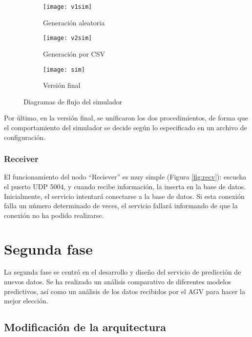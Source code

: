 \begin{figure}
    \centering
    \begin{subfigure}[b]{0.45\textwidth}
        \centering
        \texttt{[image: v1sim]}
        \caption{Generación aleatoria}
        \label{fig:v1sim}
    \end{subfigure}
    \hfill
    \begin{subfigure}[b]{0.45\textwidth}
        \centering
        \texttt{[image: v2sim]}
        \caption{Generación por CSV}
        \label{fig:v2sim}
    \end{subfigure}
    \begin{subfigure}[b]{0.7\textwidth}
        \centering
        \texttt{[image: sim]}
        \caption{Versión final}
        \label{fig:sim}
    \end{subfigure}
    \caption{Diagramas de flujo del simulador}
    \label{fig:diagsim}
\end{figure}

Por último, en la versión final, se unificaron los dos procedimientos, de forma que el comportamiento del simulador
se decide según lo especificado en un archivo de configuración.

\subsubsection{Receiver}

El funcionamiento del nodo ``Reciever'' es muy simple (Figura \ref*{fig:recv}): escucha el puerto UDP 5004, y cuando recibe información, la inserta 
en la base de datos. Inicialmente, el servicio intentará conectarse a la base de datos. Si esta conexión falla un número
determinado de veces, el servicio fallará informando de que la conexión no ha podido realizarse.


\section{Segunda fase}

La segunda fase se centró en el desarrollo y diseño del servicio de predicción de nuevos datos.
Se ha realizado un análisis comparativo de diferentes modelos predictivos, así como un análisis
de los datos recibidos por el AGV para hacer la mejor elección.

\subsection{Modificación de la arquitectura}

